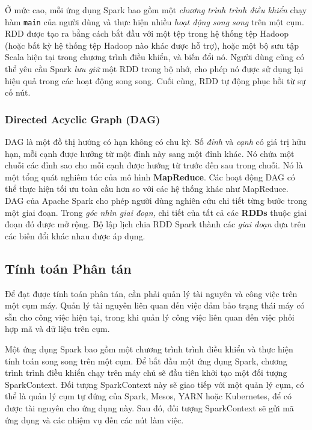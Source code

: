 Ở mức cao, mỗi ứng dụng Spark bao gồm một \textit{chương trình trình điều khiển} chạy hàm \texttt{main} của người dùng và thực hiện nhiều \textit{hoạt động song song} trên một cụm. RDD được tạo ra bằng cách bắt đầu với một tệp trong hệ thống tệp Hadoop (hoặc bất kỳ hệ thống tệp Hadoop nào khác được hỗ trợ), hoặc một bộ sưu tập Scala hiện tại trong chương trình điều khiển, và biến đổi nó. Người dùng cũng có thể yêu cầu Spark \textit{lưu giữ} một RDD trong bộ nhớ, cho phép nó được sử dụng lại hiệu quả trong các hoạt động song song. Cuối cùng, RDD tự động phục hồi từ sự cố nút.

\subsubsection*{\textbf{Directed Acyclic Graph (DAG)}}

DAG là một đồ thị hướng có hạn không có chu kỳ. Số \textit{đỉnh} và \textit{cạnh} có giá trị hữu hạn, mỗi cạnh được hướng từ một đỉnh này sang một đỉnh khác. Nó chứa một chuỗi các đỉnh sao cho mỗi cạnh được hướng từ trước đến sau trong chuỗi. Nó là một tổng quát nghiêm túc của mô hình \textbf{MapReduce}. Các hoạt động DAG có thể thực hiện tối ưu toàn cầu hơn so với các hệ thống khác như MapReduce.
\\

DAG của Apache Spark cho phép người dùng nghiên cứu chi tiết từng bước trong một giai đoạn. Trong \textit{góc nhìn giai đoạn,} chi tiết của tất cả các \textbf{RDDs} thuộc giai đoạn đó được mở rộng. Bộ lập lịch chia RDD Spark thành các \textit{giai đoạn} dựa trên các biến đổi khác nhau được áp dụng.
\newpage
\subsection{Tính toán Phân tán}

Để đạt được tính toán phân tán, cần phải quản lý tài nguyên và công việc trên một cụm máy. Quản lý tài nguyên liên quan đến việc đảm bảo trạng thái máy có sẵn cho công việc hiện tại, trong khi quản lý công việc liên quan đến việc phối hợp mã và dữ liệu trên cụm.

Một ứng dụng Spark bao gồm một chương trình trình điều khiển và thực hiện tính toán song song trên một cụm. Để bắt đầu một ứng dụng Spark, chương trình trình điều khiển chạy trên máy chủ sẽ đầu tiên khởi tạo một đối tượng SparkContext. Đối tượng SparkContext này sẽ giao tiếp với một quản lý cụm, có thể là quản lý cụm tự đứng của Spark, Mesos, YARN hoặc Kubernetes, để có được tài nguyên cho ứng dụng này. Sau đó, đối tượng SparkContext sẽ gửi mã ứng dụng và các nhiệm vụ đến các nút làm việc.

